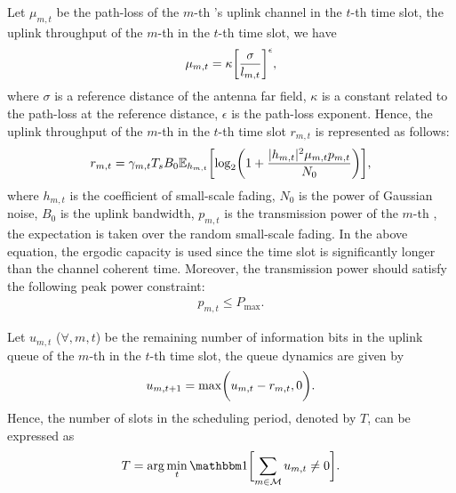Let $\mu_{m,t}$ be the path-loss of the $m$-th {\IAV}'s uplink channel in the $t$-th time slot, the uplink throughput of the $m$-th {\IAV} in the $t$-th time slot, we have
\begin{align*}
    \mu_{m,t} = \kappa \bigg[ \frac{ \sigma }{ l_{m,t} } \bigg]^{\epsilon},
\end{align*}
where $\sigma$ is a reference distance of the antenna far field, $\kappa$ is a constant related to the path-loss at the reference distance, $\epsilon$ is the path-loss exponent.
Hence, the uplink throughput of the $m$-th {\IAV} in the $t$-th time slot $r_{m,t}$ is represented as follows:
\begin{align}
    r_{m,t} = \gamma_{m,t} T_s B_0
    \mathbb{E}_{h_{m,t}} \Bracket{
        \log_{2}\Paren{ 1 + \frac{|h_{m,t}|^2 \mu_{m,t} p_{m,t}}{N_0} }
    },
    \label{eqn:vu}
\end{align}
where $h_{m,t}$ is the coefficient of small-scale fading, $N_0$ is the power of Gaussian noise, $B_0$ is the uplink bandwidth, $p_{m,t}$ is the transmission power of the $m$-th {\IAV}, the expectation is taken over the random small-scale fading.
In the above equation, the ergodic capacity is used since the time slot is significantly longer than the channel coherent time.
Moreover, the transmission power should satisfy the following peak power constraint:
\begin{align*}
    p_{m,t} \leq P_{\max}.
\end{align*}

Let $u_{m,t}$ ($\forall, m,t$) be the remaining number of information bits in the uplink queue of the $m$-th {\IAV} in the $t$-th time slot, the queue dynamics are given by
\begin{align*}
    u_{m,t+1} = \max\Paren{ u_{m,t} - r_{m,t}, 0 }.
\end{align*}
Hence, the number of slots in the scheduling period, denoted by $T$, can be expressed as
\begin{align}
    T = \arg\min_{t} \indicator\Bracket{ \sum_{m\in\carSet} u_{m,t} \neq 0 }.
\end{align}
